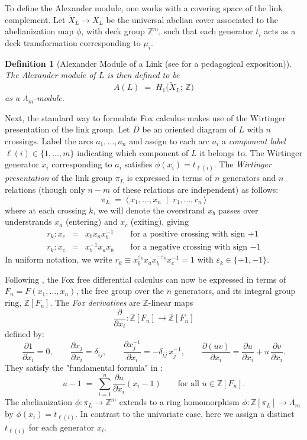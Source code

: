 \documentclass[a4paper,12pt]{article}
\newtheorem{definition}{Definition}[section]
\newcommand{\Z}{\mathbb{Z}}
\newcommand{\Lm}{\Lambda_m}
\newcommand{\AL}{A(L)}
\begin{document}
To define the Alexander module, one works with a covering space of the link complement.  Let $\widetilde{X}_L \to X_L$ be the universal abelian cover 
associated to the abelianization map $\phi$, with deck group $\Z^m$, such that each generator $t_i$ acts as a deck transformation corresponding to $\mu_i$.

\begin{definition}[Alexander Module of a Link \cite{alexander1928} (see \cite{burde2013knots} for a pedagogical exposition)]  
The \emph{Alexander module} of $L$ is then defined to be  
\[
  \AL \;=\; H_1\!\bigl(\widetilde{X}_L;\,\Z\bigr)
\]
as a $\Lm$-module.  
\end{definition}


Next, the standard way to formulate Fox calculus makes use of the Wirtinger presentation of the link group. 
Let $D$ be an oriented diagram of $L$ with $n$ crossings.
Label the arcs $a_1, \ldots, a_n$ and assign to each arc $a_i$ a
\emph{component label} $\ell(i) \in \{1, \ldots, m\}$ indicating
which component of $L$ it belongs to.
The Wirtinger generator $x_i$ corresponding to $a_i$ satisfies
$\phi(x_i) = t_{\ell(i)}$.  The \emph{Wirtinger presentation} of the link group  $\pi_L$ is expressed in terms of $n$ generators and $n$ relations (though only $n-m$ of these relations are independent) as follows:   
\[
  \pi_L \;=\;
  \langle\, x_1, \ldots, x_n \;\mid\; r_1, \ldots, r_n \,\rangle
\]
where at each crossing $k$, we will denote the overstrand $x_b$ passes over
understrands $x_a$ (entering) and $x_c$ (exiting), giving
\begin{eqnarray*}
  r_k \colon x_c &=& x_b x_a x_b^{-1}   \qquad  \mbox{for a positive crossing with sign $+1$}       \\
        r_k \colon x_c &=& x_b^{-1} x_a x_b  \qquad  \mbox{for a negative crossing with sign $-1$} 
\end{eqnarray*}
In uniform notation, we write $r_k \equiv x_b^{\varepsilon_k} x_a
x_b^{-\varepsilon_k} x_c^{-1} = 1$ with $\varepsilon_k \in \{+1,-1\}$.



Following \cite{fox1}, the Fox free differential calculus can now be expressed in terms of  $F_n = F(x_1, \ldots, x_n)$,  the free group over the $n$ generators,  and its integral group ring,  $\Z[F_n]$.  
The \emph{Fox derivatives} are  $\Z$-linear maps
\[
  \frac{\partial}{\partial x_i}
  \colon \Z[F_n] \longrightarrow \Z[F_n]
\]
defined by:
\[
  \frac{\partial 1}{\partial x_i} = 0,
  \qquad
  \frac{\partial x_j}{\partial x_i} = \delta_{ij},
  \qquad
  \frac{\partial x_j^{-1}}{\partial x_i} = -\delta_{ij}\,x_j^{-1},
  \qquad
  \frac{\partial(uv)}{\partial x_i}
    = \frac{\partial u}{\partial x_i} + u\,\frac{\partial v}{\partial x_i}.
\]
They satisfy the "fundamental formula" in \cite{fox1}: 
\[
  u - 1 \;=\; \sum_{i=1}^n \frac{\partial u}{\partial x_i}(x_i - 1)
  \qquad \text{for all } u \in \Z[F_n].
\]
The abelianization $\phi \colon \pi_L \to \Z^m$ extends to a ring
homomorphism $\phi \colon \Z[\pi_L] \to \Lm$ by
$\phi(x_i) = t_{\ell(i)}$. In contrast to the univariate case, here we assign a distinct $t_{\ell(i)}$ for each generator $x_i$.   
\end{document}
